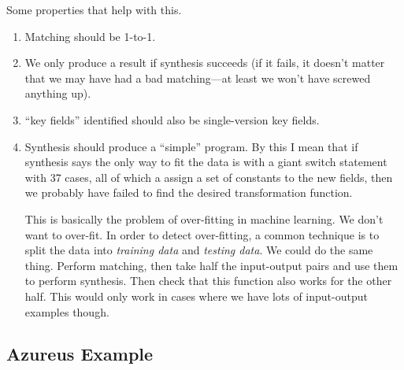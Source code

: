 Some properties that help with this.
\begin{enumerate}
\item Matching should be 1-to-1.
\item We only produce a result if synthesis succeeds (if it fails, it
  doesn't matter that we may have had a bad matching---at least we
  won't have screwed anything up).
\item ``key fields'' identified should also be single-version key fields.
\item Synthesis should produce a ``simple'' program.  By this I mean
  that if synthesis says the only way to fit the data is with a giant
  switch statement with 37 cases, all of which a assign a set of
  constants to the new fields, then we probably have failed to find
  the desired transformation function.

  This is basically the problem of over-fitting in machine learning.
  We don't want to over-fit.  In order to detect over-fitting, a
  common technique is to split the data into \emph{training data} and
  \emph{testing data}.  We could do the same thing.  Perform matching,
  then take half the input-output pairs and use them to perform
  synthesis.  Then check that this function also works for the other
  half.  This would only work in cases where we have lots of
  input-output examples though.
\end{enumerate}

\subsection{Azureus Example}



